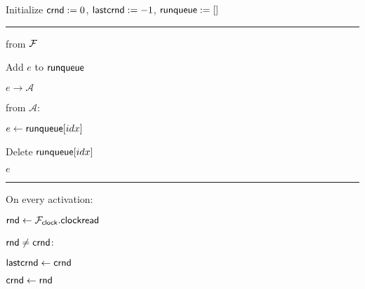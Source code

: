 \begin{bbox}[title={Wrapper $\mathcal{W}_{\msf{Eventually}} (\F)$}]

Initialize ${\mathsf {crnd}} := 0$, ${\mathsf {lastcrnd}} := -1$, ${\mathsf {runqueue}} := []$

\vspace{2mm} \hrule \vspace{2mm}

\OnInput {} from $\mathcal{F}$

	\quad Add $e$ to ${\mathsf {runqueue}}$

	\quad \Leak $e \rightarrow \mathcal{A}$

\OnInput {} from $\mathcal{A}$:

	\quad $e \leftarrow {\mathsf {runqueue}}[idx]$

	\quad Delete ${\mathsf {runqueue}}[idx]$

	 $e$

\vspace{2mm} \hrule \vspace{2mm}

On every activation:

	\quad ${\mathsf {rnd}} \leftarrow \mathcal{F}_{{\mathsf {clock}}}.{\mathsf {clockread}}$

	\quad \If ${\mathsf {rnd}} \neq {\mathsf {crnd}}$:

		\quad \quad ${\mathsf {lastcrnd}} \leftarrow {\mathsf {crnd}}$

		\quad \quad ${\mathsf {crnd}} \leftarrow {\mathsf {rnd}}$

\end{bbox}

